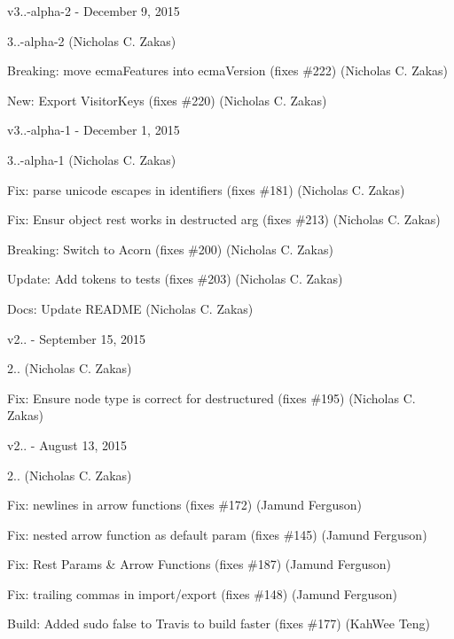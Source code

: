 v3..-\/alpha-\/2 -\/ December 9, 2015


\begin{DoxyItemize}
\item 3..-\/alpha-\/2 (Nicholas C. Zakas)
\item Breaking\+: move ecma\+Features into ecma\+Version (fixes \#222) (Nicholas C. Zakas)
\item New\+: Export Visitor\+Keys (fixes \#220) (Nicholas C. Zakas)
\end{DoxyItemize}

v3..-\/alpha-\/1 -\/ December 1, 2015


\begin{DoxyItemize}
\item 3..-\/alpha-\/1 (Nicholas C. Zakas)
\item Fix\+: parse unicode escapes in identifiers (fixes \#181) (Nicholas C. Zakas)
\item Fix\+: Ensur object rest works in destructed arg (fixes \#213) (Nicholas C. Zakas)
\item Breaking\+: Switch to Acorn (fixes \#200) (Nicholas C. Zakas)
\item Update\+: Add tokens to tests (fixes \#203) (Nicholas C. Zakas)
\item Docs\+: Update README (Nicholas C. Zakas)
\end{DoxyItemize}

v2.. -\/ September 15, 2015


\begin{DoxyItemize}
\item 2.. (Nicholas C. Zakas)
\item Fix\+: Ensure node type is correct for destructured (fixes \#195) (Nicholas C. Zakas)
\end{DoxyItemize}

v2.. -\/ August 13, 2015


\begin{DoxyItemize}
\item 2.. (Nicholas C. Zakas)
\item Fix\+: newlines in arrow functions (fixes \#172) (Jamund Ferguson)
\item Fix\+: nested arrow function as default param (fixes \#145) (Jamund Ferguson)
\item Fix\+: Rest Params \& Arrow Functions (fixes \#187) (Jamund Ferguson)
\item Fix\+: trailing commas in import/export (fixes \#148) (Jamund Ferguson)
\item Build\+: Added sudo false to Travis to build faster (fixes \#177) (Kah\+Wee Teng)
\end{DoxyItemize}

